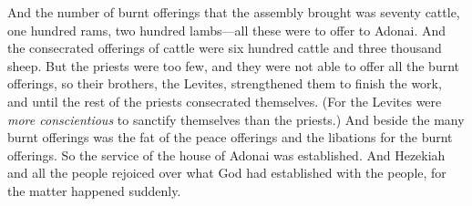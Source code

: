 \begin{biblechapter}
\verse And the number of burnt offerings that the assembly brought was seventy cattle, one hundred rams, two hundred lambs—all these were to offer to Adonai.
\verse And the consecrated offerings of cattle were six hundred cattle and three thousand sheep.
\verse But the priests were too few, and they were not able to offer all the burnt offerings, so their brothers, the Levites, strengthened them to finish the work, and until the rest of the priests consecrated themselves. (For the Levites were \textit{more conscientious} to sanctify themselves than the priests.)
\verse And beside the many burnt offerings was the fat of the peace offerings and the libations for the burnt offerings. So the service of the house of Adonai was established.
\verse And Hezekiah and all the people rejoiced over what God had established with the people, for the matter happened suddenly.
\end{biblechapter}

